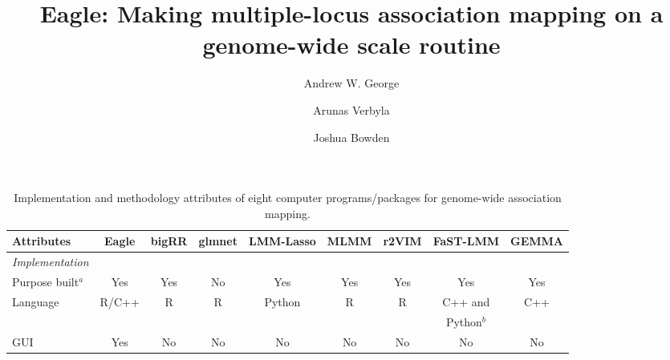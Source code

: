 \documentclass{article}
\begin{document}
\title{Eagle: Making multiple-locus association mapping on a genome-wide scale routine}
\author[1]{Andrew W. George}
\author[1]{Arunas Verbyla}
\author[2]{Joshua Bowden}


\maketitle






\begin{landscape}

\begin{table}
\caption{Implementation and methodology attributes of eight computer programs/packages for genome-wide association mapping.  }
\label{suptabsummary}
\vspace{0.5cm}
\begin{tabular}{lcccccccc} \hline
                                                   Attributes                  & {\bf Eagle}                                 & {\bf bigRR}             & {\bf glmnet}            & {\bf LMM-Lasso}                    & {\bf MLMM} & {\bf r2VIM}      & {\bf FaST-LMM} & {\bf GEMMA} \\  \hline
{\em Implementation}    &         &            &             &                   &            &                &      &      \\ [0.35cm]
\hspace{1mm}  Purpose built$^a$    &   Yes     &    Yes      &  No   &   Yes  &  Yes  &  Yes  & Yes  & Yes          \\ [0.35cm]


\hspace{1mm}  Language                 &  R/C++       &    R        &      R       &     Python     &  R          &    R         &  C++ and     &   C++   \\  
                                                          &         &            &             &                   &            &                                     &   Python$^b$       &      \\  [0.35cm]

\hspace{1mm} GUI                            & Yes &    No      & No          &  No    &  No    &   No     & No     & No    \\  [0.35cm]





\end{tabular}
\end{table}
\end{landscape}
\end{document}
